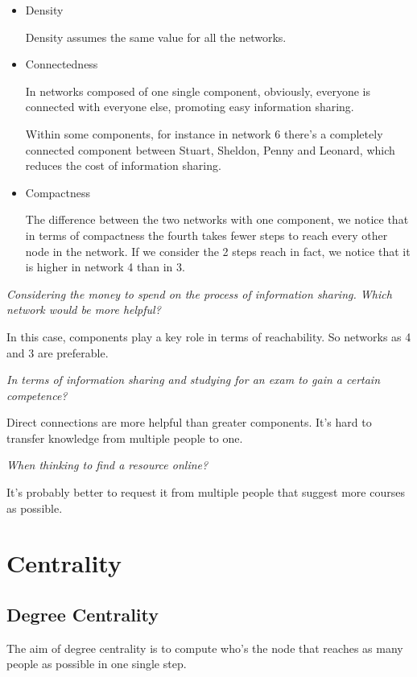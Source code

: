 \documentclass[
  notitlepage,
  onecolumn,
  openany]{book}
\begin{document}
\begin{itemize}
\item
  Density

  Density assumes the same value for all the networks.
\item
  Connectedness

  In networks composed of one single component, obviously, everyone is connected with everyone else, promoting easy information sharing.

  Within some components, for instance in network 6 there's a completely connected component between Stuart, Sheldon, Penny and Leonard, which reduces the cost of information sharing.
\item
  Compactness

  The difference between the two networks with one component, we notice that in terms of compactness the fourth takes fewer steps to reach every other node in the network. If we consider the 2 steps reach in fact, we notice that it is higher in network 4 than in 3.
\end{itemize}

\emph{Considering the money to spend on the process of information sharing. Which network would be more helpful?}

In this case, components play a key role in terms of reachability. So networks as 4 and 3 are preferable.

\emph{In terms of information sharing and studying for an exam to gain a certain competence?}

Direct connections are more helpful than greater components. It's hard to transfer knowledge from multiple people to one.

\emph{When thinking to find a resource online?}

It's probably better to request it from multiple people that suggest more courses as possible.

\hypertarget{centrality}{%
\chapter{Centrality}\label{centrality}}

\hypertarget{degree-centrality-1}{%
\section{Degree Centrality}\label{degree-centrality-1}}

The aim of degree centrality is to compute who's the node that reaches as many people as possible in one single step.
\end{document}
